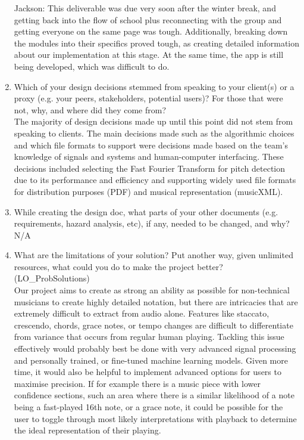 \documentclass[12pt, titlepage]{article}
\begin{document}
\begin{enumerate}
    Jackson: This deliverable was due very soon after the winter break, and getting back into 
    the flow of school plus reconnecting with the group and getting everyone on the same page 
    was tough. Additionally, breaking down the modules into their specifics proved tough, as 
    creating detailed information about our implementation at this stage. At the same time, 
    the app is still being developed, which was difficult to do. \\

    
  \item Which of your design decisions stemmed from speaking to your client(s)
  or a proxy (e.g. your peers, stakeholders, potential users)? For those that
  were not, why, and where did they come from? \\

    The majority of design decisions made up until this point did not stem from speaking to clients. 
    The main decisions made such as the algorithmic choices and which file formats to support were 
    decisions made based on the team’s knowledge of signals and systems and human-computer interfacing. 
    These decisions included selecting the Fast Fourier Transform for pitch detection due to its 
    performance and efficiency and supporting widely used file formats for distribution purposes (PDF) 
    and musical representation (musicXML). \\

  \item While creating the design doc, what parts of your other documents (e.g.
  requirements, hazard analysis, etc), if any, needed to be changed, and why? \\

    N/A \\

  \item What are the limitations of your solution? Put another way, given
  unlimited resources, what could you do to make the project better? (LO\_ProbSolutions) \\

    Our project aims to create as strong an ability as possible for non-technical musicians to create 
    highly detailed notation, but there are intricacies that are extremely difficult to extract from 
    audio alone. Features like staccato, crescendo, chords, grace notes, or tempo changes are difficult 
    to differentiate from variance that occurs from regular human playing. Tackling this issue effectively 
    would probably best be done with very advanced signal processing and personally trained, or fine-tuned 
    machine learning models. Given more time, it would also be helpful to implement advanced options for 
    users to maximise precision. If for example there is a music piece with lower confidence sections, such 
    an area where there is a similar likelihood of a note being a fast-played 16th note, or a grace note, 
    it could be possible for the user to toggle through most likely interpretations with playback to determine 
    the ideal representation of their playing. \\


\end{enumerate}
\end{document}
